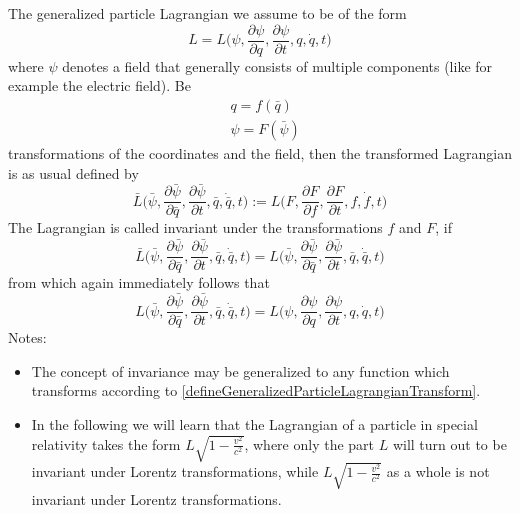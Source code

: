 \documentclass{article}
\begin{document}
The generalized particle Lagrangian we assume to be of the form
\begin{equation}
    L = L \bigg(\psi,\frac{\partial \psi}{\partial q},\frac{\partial \psi}{\partial t},q,\dot{q},t\bigg)
\end{equation}
where $\psi$ denotes a field that generally consists of multiple components (like for example the electric field).
Be
\begin{align}
    &q=f(\bar{q}) \\
    &\psi = F(\bar{\psi})
\end{align}
transformations of the coordinates and the field, then the transformed Lagrangian is as usual defined by
\begin{equation} \label{defineGeneralizedParticleLagrangianTransform}
    \bar{L} \bigg(\bar{\psi},\frac{\partial \bar{\psi}}{\partial \bar{q}},\frac{\partial \bar{\psi}}{\partial t},\bar{q},\dot{\bar{q}},t\bigg)
    := L \bigg(F,\frac{\partial F}{\partial f},\frac{\partial F}{\partial t}, f,\dot{f},t\bigg)
\end{equation}
The Lagrangian is called invariant under the transformations $f$ and $F$, if
\begin{equation} \label{defInvarianceLagrange1Generalized}
    \bar{L} \bigg(\bar{\psi},\frac{\partial \bar{\psi}}{\partial \bar{q}},\frac{\partial \bar{\psi}}{\partial t},\bar{q},\dot{\bar{q}},t\bigg)
    = L \bigg(\bar{\psi},\frac{\partial \bar{\psi}}{\partial \bar{q}},\frac{\partial \bar{\psi}}{\partial t},\bar{q},\dot{\bar{q}},t\bigg)
\end{equation}
from which again immediately follows that
\begin{equation} \label{defInvarianceLagrange2Generalized}
    L \bigg(\bar{\psi},\frac{\partial \bar{\psi}}{\partial \bar{q}},\frac{\partial \bar{\psi}}{\partial t},\bar{q},\dot{\bar{q}},t\bigg)
    = L \bigg(\psi,\frac{\partial \psi}{\partial q},\frac{\partial \psi}{\partial t},q,\dot{q},t\bigg)
\end{equation}
Notes:
\begin{itemize}
    \item The concept of invariance may be generalized to any function which transforms according to \ref{defineGeneralizedParticleLagrangianTransform}.
    \item In the following we will learn that the Lagrangian of a particle in special relativity takes the form $L \sqrt{1 - \frac{v^2}{c^2}}$,
    where only the part $L$ will turn out to be invariant under Lorentz transformations, while $L \sqrt{1 - \frac{v^2}{c^2}}$ as a whole is not invariant under Lorentz transformations.
\end{itemize}
\end{document}
